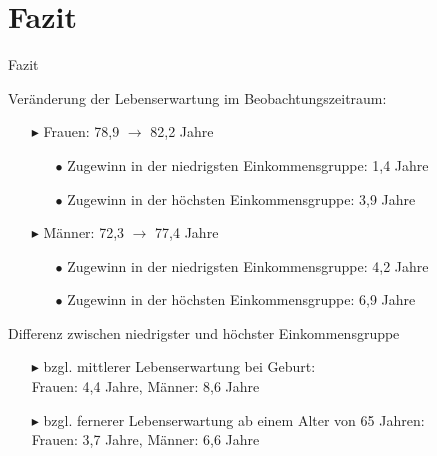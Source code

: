 \documentclass{beamer}
\begin{document}
 
\section{Fazit}
\begin{frame}{Fazit}
	\begin{block}{Veränderung der Lebenserwartung im Beobachtungszeitraum:}
		\begin{itemize}
			\item[$\blacktriangleright$] Frauen: 78,9 $\rightarrow$ 82,2 Jahre\\
			\begin{itemize}
			\item[$\bullet$] Zugewinn in der niedrigsten Einkommensgruppe: 1,4 Jahre
			\item[$\bullet$]Zugewinn in der höchsten Einkommensgruppe: 3,9 Jahre
			\end{itemize}								
			\item[$\blacktriangleright$] Männer: 72,3 $\rightarrow$ 77,4 Jahre
			\begin{itemize}
				\item[$\bullet$] Zugewinn in der niedrigsten Einkommensgruppe: 4,2 Jahre
				\item[$\bullet$] Zugewinn in der höchsten Einkommensgruppe: 6,9 Jahre
			\end{itemize}
		\end{itemize}
	\end{block}
	\pause
	\begin{block}{Differenz zwischen niedrigster und höchster Einkommensgruppe}
		\begin{itemize}
			\item[$\blacktriangleright$] bzgl. mittlerer Lebenserwartung bei Geburt:\\ Frauen: 4,4 Jahre, Männer: 8,6 Jahre
			\item[$\blacktriangleright$] bzgl. fernerer Lebenserwartung ab einem Alter von 65 Jahren:\\ Frauen: 3,7 Jahre, Männer: 6,6 Jahre
		\end{itemize}
	\end{block}
\end{frame}
\end{document}
